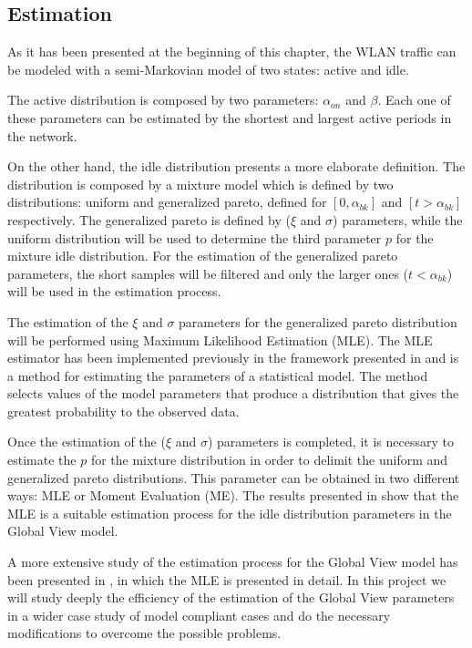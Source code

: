 \subsection{Estimation} \label{sec:globalview_estimation}
As it has been presented at the beginning of this chapter, the \acs{WLAN} traffic can be modeled with a semi-Markovian model of two states: active and idle.

The active distribution is composed by two parameters: $\alpha_{on}$ and $\beta$. Each one of these parameters can be estimated by the shortest and largest active periods in the network.

On the other hand, the idle distribution presents a more elaborate definition. The distribution is composed by a mixture model which is defined by two distributions: uniform and generalized pareto, defined for ${[0, \alpha_{bk}]}$ and $[t > \alpha_{bk}]$ respectively. The generalized pareto is defined by ($\xi$ and $\sigma$) parameters, while the uniform distribution will be used to determine the third parameter $p$ for the mixture idle distribution. For the estimation of the generalized pareto parameters, the short samples will be filtered and only the larger ones ($t < \alpha_{bk}$) will be used in the estimation process.

The estimation of the $\xi$ and $\sigma$ parameters for the generalized pareto distribution will be performed using Maximum Likelihood Estimation (\acs{MLE}). The \acs{MLE} estimator has been implemented previously in the framework presented in \cite{marcello-thesis} and is a method for estimating the parameters of a statistical model. The method selects values of the model parameters that produce a distribution that gives the greatest probability to the observed data.

Once the estimation of the ($\xi$ and $\sigma$) parameters is completed, it is necessary to estimate the $p$ for the mixture distribution in order to delimit the uniform and generalized pareto distributions. This parameter can be obtained in two different ways: \acs{MLE} or Moment Evaluation (\acs{ME}). The results presented in \cite{marcello-thesis} show that the \acs{MLE} is a suitable estimation process for the idle distribution parameters in the Global View model.

A more extensive study of the estimation process for the Global View model has been presented in \cite{marcello}, in which the \acs{MLE} is presented in detail. In this project we will study deeply the efficiency of the estimation of the Global View parameters in a wider case study of model compliant cases and do the necessary modifications to overcome the possible problems.